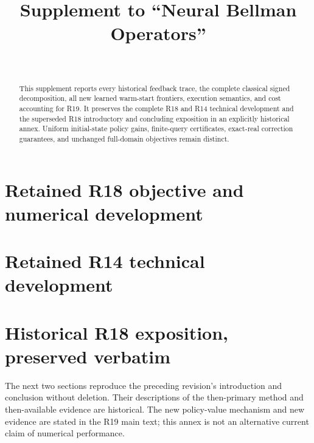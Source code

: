 \documentclass[ecta]{econsocart}
\theoremstyle{remark}
\begin{document}
\begin{frontmatter}
\title{Supplement to ``Neural Bellman Operators''}
\begin{aug}
\author[id=au1,addressref={add1}]{~}
\address[id=add1]{}
\end{aug}
\begin{abstract}
This supplement reports every historical feedback trace, the complete classical signed decomposition, all new learned warm-start frontiers, execution semantics, and cost accounting for R19. It preserves the complete R18 and R14 technical development and the superseded R18 introductory and concluding exposition in an explicitly historical annex. Uniform initial-state policy gains, finite-query certificates, exact-real correction guarantees, and unchanged full-domain objectives remain distinct.
\end{abstract}
\end{frontmatter}

\section{Retained R18 objective and numerical development}


\section{Retained R14 technical development}

\clearpage
\section{Historical R18 exposition, preserved verbatim}
The next two sections reproduce the preceding revision's introduction and conclusion without deletion. Their descriptions of the then-primary method and then-available evidence are historical. The new policy-value mechanism and new evidence are stated in the R19 main text; this annex is not an alternative current claim of numerical performance.


\clearpage

\end{document}
